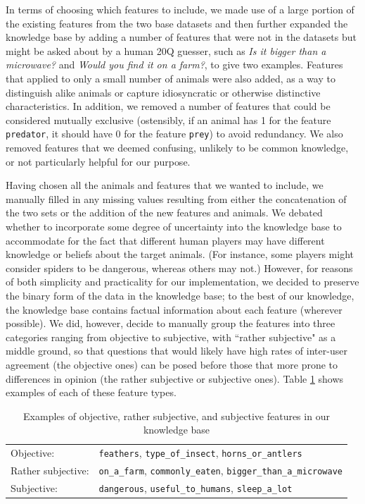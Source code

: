 \documentclass[11pt,a4paper]{article}
\begin{document}
In terms of choosing which features to include, we made use of a large portion of the existing features from the two base datasets and then further expanded the knowledge base by adding a number of features that were not in the datasets but might be asked about by a human 20Q guesser, such as \textit{Is it bigger than a microwave?} and \textit{Would you find it on a farm?}, to give two examples.
Features that applied to only a small number of animals were also added, as a way to distinguish alike animals or capture idiosyncratic or otherwise distinctive characteristics. 
In addition, we removed a number of features that could be considered mutually exclusive (ostensibly, if an animal has 1 for the feature \texttt{predator}, it should have 0 for the feature \texttt{prey}) to avoid redundancy. 
We also removed features that we deemed confusing, unlikely to be common knowledge, or not particularly helpful for our purpose.

Having chosen all the animals and features that we wanted to include, we manually filled in any missing values resulting from either the concatenation of the two sets or the addition of the new features and animals. 
We debated whether to incorporate some degree of uncertainty into the knowledge base to accommodate for the fact that different human players may have different knowledge or beliefs about the target animals. 
(For instance, some players might consider spiders to be dangerous, whereas others may not.) 
However, for reasons of both simplicity and practicality for our implementation, we decided to preserve the binary form of the data in the knowledge base; to the best of our knowledge, the knowledge base contains factual information about each feature (wherever possible). 
We did, however, decide to manually group the features into three categories ranging from objective to subjective, with ``rather subjective" as a middle ground, so that questions that would likely have high rates of inter-user agreement (the objective ones) can be posed before those that more prone to differences in opinion (the rather subjective or subjective ones). 
Table \ref{tab:feature-types} shows examples of each of these feature types.

\begin{table}
    \centering
    \begin{tabular}{ll}
    \toprule
         Objective: &  \texttt{feathers}, \texttt{type\_of\_insect}, \texttt{horns\_or\_antlers} \\
         Rather subjective: & \texttt{on\_a\_farm}, \texttt{commonly\_eaten}, \texttt{bigger\_than\_a\_microwave} \\
         Subjective: & \texttt{dangerous}, \texttt{useful\_to\_humans}, \texttt{sleep\_a\_lot}\\
    \bottomrule
    \end{tabular}
    \caption{Examples of objective, rather subjective, and subjective features in our knowledge base}
    \label{tab:feature-types}
\end{table}
\end{document}
